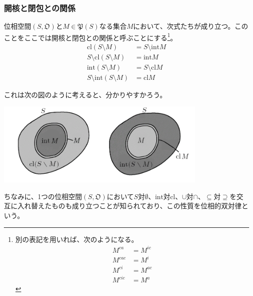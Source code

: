 \documentclass[dvipdfmx]{jsarticle}
\begin{document}
\subsubsection{開核と閉包との関係}%
\begin{thm}\label{8.1.1.8}
位相空間$\left( S,\mathfrak{O} \right)$と$M \in \mathfrak{P}(S)$なる集合$M$において、次式たちが成り立つ。このことをここでは開核と閉包との関係と呼ぶことにする\footnote{別の表記を用いれば、次のようになる。
\begin{align*}
  M^{ca} &= M^{ic}\\
  M^{cac} &= M^{i}\\
  M^{ci} &= M^{ac}\\
  M^{cic} &= M^{a}
\end{align*}}。
\begin{align*}
{\mathrm{cl}}(S \setminus M) &= S \setminus {\mathrm{int}}M\\
S \setminus {\mathrm{cl}}(S \setminus M) &= {\mathrm{int}}M\\
{\mathrm{int}}(S \setminus M) &= S \setminus {\mathrm{cl}}M\\
S \setminus {\mathrm{int}}(S \setminus M) &= {\mathrm{cl}}M
\end{align*}
\end{thm}\par
これは次の図のように考えると、分かりやすかろう。
\begin{center}
  \includegraphics[width=104mm]{8.1.1.c.png}
\end{center}
ちなみに、1つの位相空間$\left( S,\mathfrak{O} \right)$において$S$対$\emptyset$、$\mathrm{int}$対$\mathrm{cl}$、$\cup$対$\cap$、$\subseteq$対$\supseteq$を交互に入れ替えたものも成り立つことが知られており、この性質を位相的双対律という。
\end{document}
